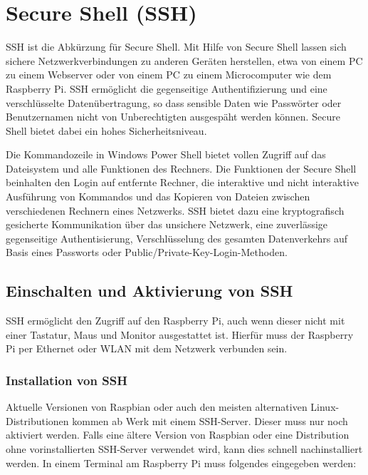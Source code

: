 %
%

\chapter{Secure Shell (SSH)}


SSH ist die Abkürzung für Secure Shell. Mit Hilfe von Secure Shell lassen sich sichere Netzwerkverbindungen zu anderen Geräten herstellen, etwa von einem PC zu einem Webserver oder von einem PC zu einem Microcomputer wie dem Raspberry Pi. SSH ermöglicht die gegenseitige Authentifizierung und eine verschlüsselte Datenübertragung, so dass sensible Daten wie Passwörter oder Benutzernamen nicht von Unberechtigten ausgespäht werden können. Secure Shell bietet dabei ein hohes Sicherheitsniveau.

Die Kommandozeile in Windows Power Shell bietet vollen Zugriff auf das Dateisystem und alle Funktionen des Rechners. 
Die Funktionen der Secure Shell beinhalten den Login auf entfernte Rechner, die interaktive und nicht interaktive Ausführung von Kommandos und das Kopieren von Dateien zwischen verschiedenen Rechnern eines Netzwerks. SSH bietet dazu eine kryptografisch gesicherte Kommunikation über das unsichere Netzwerk, eine zuverlässige gegenseitige Authentisierung, Verschlüsselung des gesamten Datenverkehrs auf Basis eines Passworts oder Public/Private-Key-Login-Methoden.


\section{Einschalten und Aktivierung von SSH}

SSH ermöglicht den Zugriff auf den Raspberry Pi, auch wenn dieser nicht mit einer Tastatur, Maus und Monitor
ausgestattet ist. Hierfür muss der Raspberry Pi per Ethernet oder WLAN mit dem Netzwerk verbunden sein. 

\subsection{Installation von SSH}

Aktuelle Versionen von Raspbian oder auch den meisten alternativen Linux-Distributionen kommen ab Werk mit einem SSH-Server. Dieser muss nur noch aktiviert werden. Falls eine ältere Version von Raspbian oder eine Distribution ohne vorinstallierten SSH-Server verwendet wird, kann dies schnell nachinstalliert werden. In einem Terminal am Raspberry Pi muss folgendes eingegeben werden:

